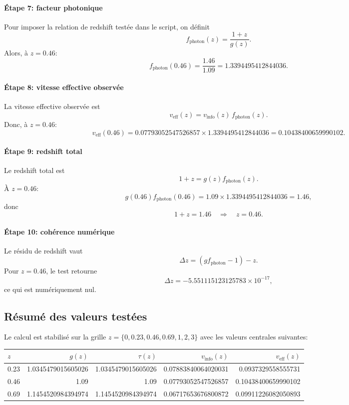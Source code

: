 \paragraph{Étape 7: facteur photonique}
Pour imposer la relation de redshift testée dans le script, on définit
\[
f_{\mathrm{photon}}(z)=\frac{1+z}{g(z)}.
\]
Alors, à $z=0.46$:
\[
f_{\mathrm{photon}}(0.46)=\frac{1.46}{1.09}=1.3394495412844036.
\]

\paragraph{Étape 8: vitesse effective observée}
La vitesse effective observée est
\[
v_{\mathrm{eff}}(z)=v_{\mathrm{info}}(z)\,f_{\mathrm{photon}}(z).
\]
Donc, à $z=0.46$:
\[
v_{\mathrm{eff}}(0.46)=0.07793052547526857\times 1.3394495412844036
=0.10438400659990102.
\]

\paragraph{Étape 9: redshift total}
Le redshift total est
\[
1+z=g(z)f_{\mathrm{photon}}(z).
\]
À $z=0.46$:
\[
g(0.46)f_{\mathrm{photon}}(0.46)=1.09\times 1.3394495412844036=1.46,
\]
donc
\[
1+z=1.46 \quad\Rightarrow\quad z=0.46.
\]

\paragraph{Étape 10: cohérence numérique}
Le résidu de redshift vaut
\[
\Delta z = (g f_{\mathrm{photon}}-1)-z.
\]
Pour $z=0.46$, le test retourne
\[
\Delta z = -5.551115123125783\times 10^{-17},
\]
ce qui est numériquement nul.

\subsection{Résumé des valeurs testées}
Le calcul est stabilisé sur la grille $z=\{0,0.23,0.46,0.69,1,2,3\}$ avec les valeurs centrales suivantes:
\begin{center}
\begin{tabular}{lrrrr}
\hline
$z$ & $g(z)$ & $\tau(z)$ & $v_{\mathrm{info}}(z)$ & $v_{\mathrm{eff}}(z)$ \\
\hline
0.23 & 1.0345479015605026 & 1.0345479015605026 & 0.07883840064020031 & 0.0937329558555731 \\
0.46 & 1.09 & 1.09 & 0.07793052547526857 & 0.10438400659990102 \\
0.69 & 1.1454520984394974 & 1.1454520984394974 & 0.06717653676800872 & 0.09911226082050893 \\
\hline
\end{tabular}
\end{center}

